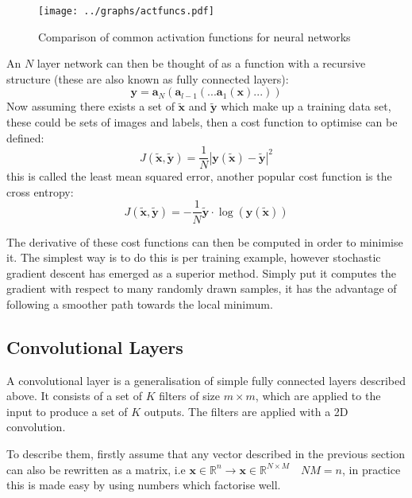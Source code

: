 \documentclass[11pt,twoside]{report}
\begin{document}
\begin{figure} \label{disfagraph}
    \center
  \texttt{[image: ../graphs/actfuncs.pdf]}
  \caption{Comparison of common activation functions for neural networks}
\end{figure}



An $N$ layer network can
then be thought of as a function with a recursive structure (these are also known as fully connected layers):
\begin{equation}
    \mathbf{y} = \mathbf{a}_{N}(\mathbf{a}_{l-1}(...\mathbf{a}_1(\mathbf{x})...))
\end{equation}
Now assuming there exists a set of $\tilde{\mathbf{x}}$ and $\tilde{\mathbf{y}}$ which make
up a training data set, these could be sets of images and labels, then a cost function
to optimise can be defined:
\begin{equation}
    J(\tilde{\mathbf{x}},\tilde{\mathbf{y}}) = \frac{1}{N}\left |\mathbf{y}(\tilde{\mathbf{x}})-\tilde{\mathbf{y}}\right | ^2
\end{equation}
this is called the least mean squared error, another popular cost function is
the cross entropy:
\begin{equation}
    J(\tilde{\mathbf{x}},\tilde{\mathbf{y}}) = -\frac{1}{N}\tilde{\mathbf{y}}\cdot\log(\mathbf{y}(\tilde{\mathbf{x}}))
\end{equation}

The derivative of these cost functions can then be computed in order to minimise it.
The simplest way is to do this is per training example, however stochastic gradient
descent\cite{Amari1993} has emerged as a superior method. Simply put it computes the gradient with respect
to many randomly drawn samples, it has the advantage of following a smoother path
towards the local minimum.
\subsection{Convolutional Layers}
A convolutional layer is a generalisation of simple fully connected layers described
above. It consists of a set of $K$ filters of size $m\times m$, which are applied to the input to produce
a set of $K$ outputs. The filters are applied with a 2D convolution.


To describe them, firstly assume that any vector described in the previous section
can also be rewritten as a matrix, i.e $\mathbf{x} \in \mathbb{R}^{n}
\rightarrow \mathbf{x} \in \mathbb{R}^{N \times M} \quad NM=n$, in practice this is made
easy by using numbers which factorise well.
\end{document}
